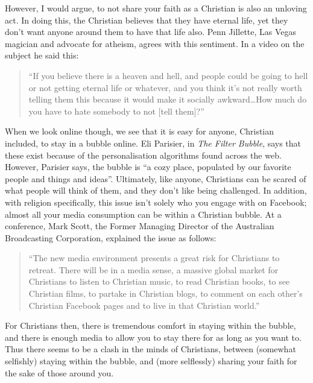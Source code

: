 \documentclass[]{article}
\begin{document}
However, I would argue, to not share your faith as a Christian is also
an unloving act. In doing this, the Christian believes that they have
eternal life, yet they don't want anyone around them to have that life
also. Penn Jillette, Las Vegas magician and advocate for atheism, agrees
with this sentiment. In a video on the subject he said this:

\begin{quote}
``If you believe there is a heaven and hell, and people could be going
to hell or not getting eternal life or whatever, and you think it's not
really worth telling them this because it would make it socially
awkward\ldots{}How much do you have to hate somebody to not {[}tell
them{]}?'' \autocite{JilletteGiftBible2010}
\end{quote}

When we look online though, we see that it is easy for anyone, Christian
included, to stay in a bubble online. Eli Parisier, in \emph{The Filter
Bubble}, says that these exist because of the personalisation algorithms
found across the web. However, Parisier says, the bubble is ``a cozy
place, populated by our favorite people and things and
ideas''\autocite[pg 12]{PariserFilterBubblewhat2012}. Ultimately, like
anyone, Christians can be scared of what people will think of them, and
they don't like being challenged. In addition, with religion
specifically, this issue isn't solely who you engage with on Facebook;
almost all your media consumption can be within a Christian bubble. At a
conference, Mark Scott, the Former Managing Director of the Australian
Broadcasting Corporation, explained the issue as follows:

\begin{quote}
``The new media environment presents a great risk for Christians to
retreat. There will be in a media sense, a massive global market for
Christians to listen to Christian music, to read Christian books, to see
Christian films, to partake in Christian blogs, to comment on each
other's Christian Facebook pages and to live in that Christian
world.''\autocite{TaylorMarkScottChristians2014}
\end{quote}

For Christians then, there is tremendous comfort in staying within the
bubble, and there is enough media to allow you to stay there for as long
as you want to. Thus there seems to be a clash in the minds of
Christians, between (somewhat selfishly) staying within the bubble, and
(more selflessly) sharing your faith for the sake of those around you.
\end{document}
